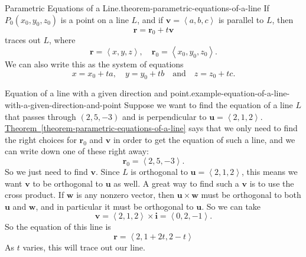 \documentclass[10pt,]{book}
\numberwithin{equation}{section}
\newcommand{\RR}{\mathbb{R}}
\newcommand{\vv}[1]{\mathbf{#1}}
\newcommand{\dotprod}[1]{\left\langle #1 \right\rangle}
\begin{document}
\begin{theorem}{Parametric Equations of a Line.}{}{theorem-parametric-equations-of-a-line}%
\index{lines!parametric equations in \(\RR^{3}\)}\hypertarget{p-1205}{}%
If \(P_{0}(x_{0},y_{0},z_{0})\) is a point on a line \(L\), and if \(\vv{v} = \dotprod{a,b,c}\) is parallel to \(L\), then%
%
\begin{equation*}
\vv{r} = \vv{r}_{0}+t\vv{v}
\end{equation*}
\hypertarget{p-1206}{}%
traces out \(L\), where%
%
\begin{equation*}
\vv{r} = \dotprod{x,y,z},\quad\vv{r}_{0} = \dotprod{x_{0},y_{0},z_{0}}.
\end{equation*}
\hypertarget{p-1207}{}%
We can also write this as the system of equations%
%
\begin{equation*}
x = x_{0}+ta,\quad y=y_{0}+tb\quad\text{and}\quad z = z_{0}+tc.
\end{equation*}
\end{theorem}
\begin{example}{Equation of a line with a given direction and point.}{example-equation-of-a-line-with-a-given-direction-and-point}%
\hypertarget{p-1208}{}%
Suppose we want to find the equation of a line \(L\) that passes through \((2,5,-3)\) and is perpendicular to \(\vv{u} = \dotprod{2,1,2}\). \hyperref[theorem-parametric-equations-of-a-line]{Theorem~\ref{theorem-parametric-equations-of-a-line}} says that we only need to find the right choices for \(\vv{r}_{0}\) and \(\vv{v}\) in order to get the equation of such a line, and we can write down one of these right away:%
%
\begin{equation*}
\vv{r}_{0} = \dotprod{2,5,-3}.
\end{equation*}
\hypertarget{p-1209}{}%
So we just need to find \(\vv{v}\). Since \(L\) is orthogonal to \(\vv{u} = \dotprod{2,1,2}\), this means we want \(\vv{v}\) to be orthogonal to \(\vv{u}\) as well. A great way to find such a \(\vv{v}\) is to use the cross product. If \(\vv{w}\) is any nonzero vector, then \(\vv{u}\times\vv{w}\) must be orthogonal to both \(\vv{u}\) and \(\vv{w}\), and in particular it must be orthogonal to \(\vv{u}\). So we can take%
%
\begin{equation*}
\vv{v} = \dotprod{2,1,2}\times\vv{i} = \dotprod{0,2,-1}.
\end{equation*}
\hypertarget{p-1210}{}%
So the equation of this line is%
%
\begin{equation*}
\vv{r} = \dotprod{2,1+2t,2-t}
\end{equation*}
\hypertarget{p-1211}{}%
As \(t\) varies, this will trace out our line.%
\end{example}
\end{document}
